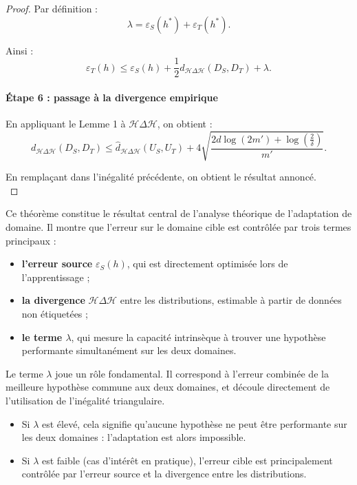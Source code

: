 \documentclass[a4paper,12pt]{article}
\theoremstyle{definition}
\theoremstyle{remark}
\begin{document}
\begin{proof}
Par définition :
\[
\lambda = \varepsilon_S(h^*) + \varepsilon_T(h^*).
\]

Ainsi :
\[
\varepsilon_T(h)
\le
\varepsilon_S(h)
+ \frac{1}{2} d_{\mathcal{H} \Delta \mathcal{H}}(D_S, D_T)
+ \lambda.
\]

\paragraph{Étape 6 : passage à la divergence empirique}

En appliquant le Lemme 1 à $\mathcal{H} \Delta \mathcal{H}$, on obtient :
\[
d_{\mathcal{H} \Delta \mathcal{H}}(D_S, D_T)
\le
\hat{d}_{\mathcal{H} \Delta \mathcal{H}}(U_S, U_T)
+ 4 \sqrt{\frac{2d \log(2m') + \log\left(\frac{2}{\delta}\right)}{m'}}.
\]

En remplaçant dans l’inégalité précédente, on obtient le résultat annoncé.\\

\end{proof}


Ce théorème constitue le résultat central de l’analyse théorique de l’adaptation de domaine. Il montre que l’erreur sur le domaine cible est contrôlée par trois termes principaux :

\begin{itemize}
\item \textbf{l’erreur source} $\varepsilon_S(h)$, qui est directement optimisée lors de l’apprentissage ;
\item \textbf{la divergence} $\mathcal{H}\Delta\mathcal{H}$ entre les distributions, estimable à partir de données non étiquetées ;
\item \textbf{le terme $\lambda$}, qui mesure la capacité intrinsèque à trouver une hypothèse performante simultanément sur les deux domaines.
\end{itemize}

Le terme $\lambda$ joue un rôle fondamental. Il correspond à l’erreur combinée de la meilleure hypothèse commune aux deux domaines, et découle directement de l’utilisation de l’inégalité triangulaire.

\begin{itemize}
\item Si $\lambda$ est élevé, cela signifie qu’aucune hypothèse ne peut être performante sur les deux domaines : l’adaptation est alors impossible.
\item Si $\lambda$ est faible (cas d’intérêt en pratique), l’erreur cible est principalement contrôlée par l’erreur source et la divergence entre les distributions.
\end{itemize}
\end{document}
